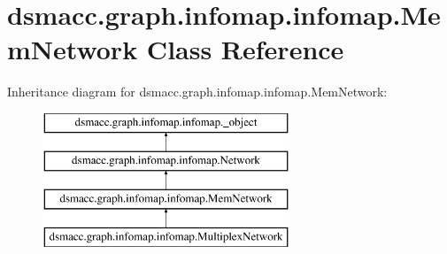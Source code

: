 \hypertarget{classdsmacc_1_1graph_1_1infomap_1_1infomap_1_1MemNetwork}{}\section{dsmacc.\+graph.\+infomap.\+infomap.\+Mem\+Network Class Reference}
\label{classdsmacc_1_1graph_1_1infomap_1_1infomap_1_1MemNetwork}
Inheritance diagram for dsmacc.\+graph.\+infomap.\+infomap.\+Mem\+Network\+:\begin{figure}[H]
\begin{center}
\leavevmode
\includegraphics[height=4.000000cm]{classdsmacc_1_1graph_1_1infomap_1_1infomap_1_1MemNetwork}
\end{center}
\end{figure}
